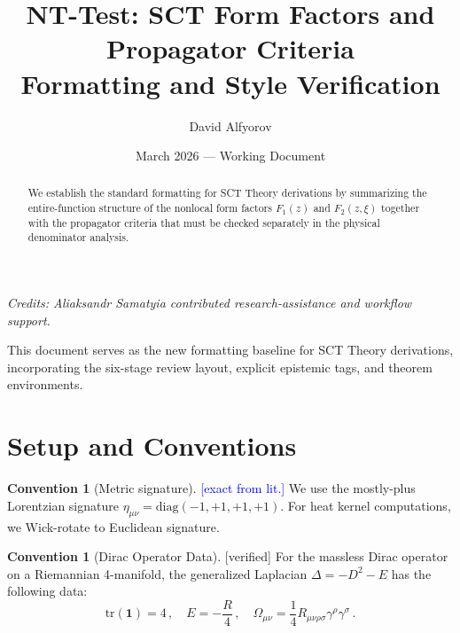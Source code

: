 \documentclass[11pt,a4paper]{article}
\theoremstyle{definition}
\newtheorem{convention}[theorem]{Convention}
\theoremstyle{remark}
\newcommand{\exact}{\textcolor{blue}{[exact from lit.] }}
\newcommand{\verified}{\textcolor{green!60!black}{[verified] }}
\begin{document}
\title{\textbf{NT-Test: SCT Form Factors and Propagator Criteria} \\ \large Formatting and Style Verification}
\author{David Alfyorov}
\date{March 2026 --- Working Document}

\maketitle


\begin{center}
\small\textit{Credits: Aliaksandr Samatyia contributed research-assistance and workflow support.}
\end{center}

\begin{tcolorbox}[colback=green!5!white,colframe=green!60!black,title=\textbf{STATUS: VERIFIED}]
This document serves as the new formatting baseline for SCT Theory derivations, incorporating the six-stage review layout, explicit epistemic tags, and theorem environments.
\end{tcolorbox}

\begin{abstract}
We establish the standard formatting for SCT Theory derivations by summarizing the entire-function structure of the nonlocal form factors $F_1(z)$ and $F_2(z, \xi)$ together with the propagator criteria that must be checked separately in the physical denominator analysis.
\end{abstract}

\tableofcontents
\vspace{1cm}

\section{Setup and Conventions}

\begin{convention}[Metric signature]
\exact We use the mostly-plus Lorentzian signature $\eta_{\mu\nu} = \text{diag}(-1, +1, +1, +1)$. For heat kernel computations, we Wick-rotate to Euclidean signature.
\end{convention}

\begin{convention}[Dirac Operator Data]
\verified For the massless Dirac operator on a Riemannian 4-manifold, the generalized Laplacian $\Delta = -D^2 - E$ has the following data:
\begin{equation}
    \text{tr}(\mathbf{1}) = 4\,, \quad E = -\frac{R}{4}\,, \quad \Omega_{\mu\nu} = \frac{1}{4}R_{\mu\nu\rho\sigma}\gamma^\rho\gamma^\sigma\,.
\end{equation}
\end{convention}
\end{document}
